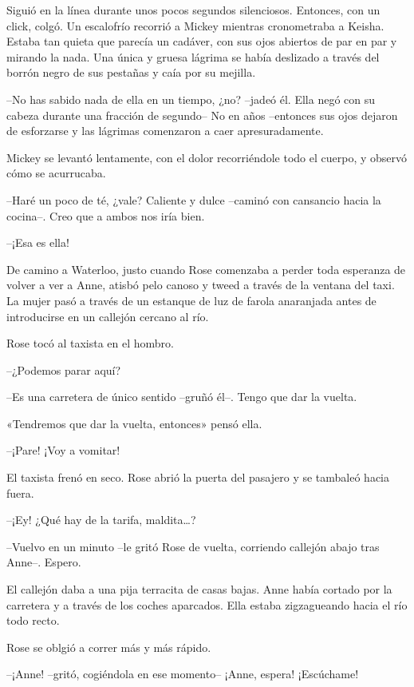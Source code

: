 {Siguió en la línea durante unos pocos segundos silenciosos. Entonces,
 con un click, colgó. Un escalofrío recorrió a Mickey mientras
 cronometraba a Keisha. Estaba tan quieta que parecía un cadáver, con sus
 ojos abiertos de par en par y mirando la nada. Una única y gruesa
 lágrima se había deslizado a través del borrón negro de sus pestañas y
caía por su mejilla.}

{--No has sabido nada de ella en un tiempo, ¿no? --jadeó él. Ella negó
 con su cabeza durante una fracción de segundo-- No en años --entonces
 sus ojos dejaron de esforzarse y las lágrimas comenzaron a caer
apresuradamente.}

{Mickey se levantó lentamente, con el dolor recorriéndole todo el
cuerpo, y observó cómo se acurrucaba.}

{--Haré un poco de té, ¿vale? Caliente y dulce --caminó con cansancio
hacia la cocina--. Creo que a ambos nos iría bien.}

\mbox{}

{--¡Esa es ella!}

{De camino a Waterloo, justo cuando Rose comenzaba a perder toda
 esperanza de volver a ver a Anne, atisbó pelo canoso y tweed a través de
 la ventana del taxi. La mujer pasó a través de un estanque de luz de
farola anaranjada antes de introducirse en un callejón cercano al río.}

{Rose tocó al taxista en el hombro.}

{--¿Podemos parar aquí?}

{--Es una carretera de único sentido --gruñó él--. Tengo que dar la
vuelta.}

{«Tendremos que dar la vuelta, entonces» pensó ella.}

{--¡Pare! ¡Voy a vomitar!}

{El taxista frenó en seco. Rose abrió la puerta del pasajero y se
tambaleó hacia fuera.}

{--¡Ey! ¿Qué hay de la tarifa, maldita\ldots{}?}

{--Vuelvo en un minuto --le gritó Rose de vuelta, corriendo callejón
abajo tras Anne--. Espero.}

{El callejón daba a una pija terracita de casas bajas. Anne había
 cortado por la carretera y a través de los coches aparcados. Ella estaba
zigzagueando hacia el río todo recto.}

{Rose se oblgió a correr más y más rápido.}

{--¡Anne! --gritó, cogiéndola en ese momento-- ¡Anne, espera!
¡Escúchame!}

